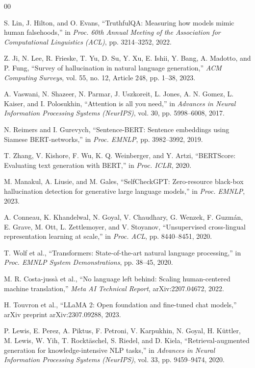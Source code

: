 \documentclass[conference]{IEEEtran}
\begin{document}
\begin{thebibliography}{00}

S. Lin, J. Hilton, and O. Evans, ``TruthfulQA: Measuring 
how models mimic human falsehoods,'' in \emph{Proc. 60th 
Annual Meeting of the Association for Computational 
Linguistics (ACL)}, pp. 3214--3252, 2022.

Z. Ji, N. Lee, R. Frieske, T. Yu, D. Su, Y. Xu, E. Ishii, 
Y. Bang, A. Madotto, and P. Fung, ``Survey of hallucination 
in natural language generation,'' \emph{ACM Computing 
Surveys}, vol. 55, no. 12, Article 248, pp. 1--38, 2023.

A. Vaswani, N. Shazeer, N. Parmar, J. Uszkoreit, L. Jones, 
A. N. Gomez, L. Kaiser, and I. Polosukhin, ``Attention is 
all you need,'' in \emph{Advances in Neural Information 
Processing Systems (NeurIPS)}, vol. 30, pp. 5998--6008, 
2017.

N. Reimers and I. Gurevych, ``Sentence-BERT: Sentence 
embeddings using Siamese BERT-networks,'' in \emph{Proc. 
EMNLP}, pp. 3982--3992, 2019.

T. Zhang, V. Kishore, F. Wu, K. Q. Weinberger, and Y. Artzi, 
``BERTScore: Evaluating text generation with BERT,'' in 
\emph{Proc. ICLR}, 2020.

M. Manakul, A. Liusie, and M. Gales, ``SelfCheckGPT: 
Zero-resource black-box hallucination detection for 
generative large language models,'' in \emph{Proc. EMNLP}, 
2023.

A. Conneau, K. Khandelwal, N. Goyal, V. Chaudhary, 
G. Wenzek, F. Guzm\'{a}n, E. Grave, M. Ott, 
L. Zettlemoyer, and V. Stoyanov, ``Unsupervised 
cross-lingual representation learning at scale,'' in 
\emph{Proc. ACL}, pp. 8440--8451, 2020.

T. Wolf et al., ``Transformers: State-of-the-art natural 
language processing,'' in \emph{Proc. EMNLP System 
Demonstrations}, pp. 38--45, 2020.

M. R. Costa-juss\`{a} et al., ``No language left behind: 
Scaling human-centered machine translation,'' \emph{Meta 
AI Technical Report}, arXiv:2207.04672, 2022.

H. Touvron et al., ``LLaMA 2: Open foundation and 
fine-tuned chat models,'' arXiv preprint 
arXiv:2307.09288, 2023.

P. Lewis, E. Perez, A. Piktus, F. Petroni, V. Karpukhin, 
N. Goyal, H. K\"{u}ttler, M. Lewis, W. Yih, 
T. Rockt\"{a}schel, S. Riedel, and D. Kiela, 
``Retrieval-augmented generation for knowledge-intensive 
NLP tasks,'' in \emph{Advances in Neural Information 
Processing Systems (NeurIPS)}, vol. 33, pp. 9459--9474, 
2020.


\end{thebibliography}
\end{document}
